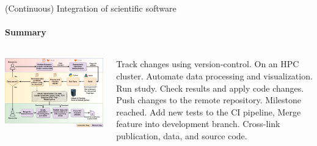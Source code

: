 \begin{frame}{(Continuous) Integration of scientific software} 
    \framesubtitle{Summary}

\begin{columns}
    \begin{column}[c]{0.51\textwidth}
        \centering
        \includegraphics[width=\columnwidth]{figures/ZINF-CI-diagram-individual.pdf}
    \end{column}
    \begin{column}[c]{0.49\textwidth}
        \footnotesize
        \begin{algorithmic}[1]
            \State Track changes using version-control.
                 \Comment On an HPC cluster.
                    \State Automate data processing and visualization.
                    \State Run study.
                    \State Check results and apply code changes. 
                \EndFor
                    \State Push changes to the remote repository. 
                        \State Milestone reached.
                        \State Add new tests to the CI pipeline, 
                        \State Merge feature into development branch. 
                        \State Cross-link publication, data, and source code.
                    \EndIf
                \EndIf
            \EndWhile
        \end{algorithmic}
    \end{column}
\end{columns}

\end{frame}

